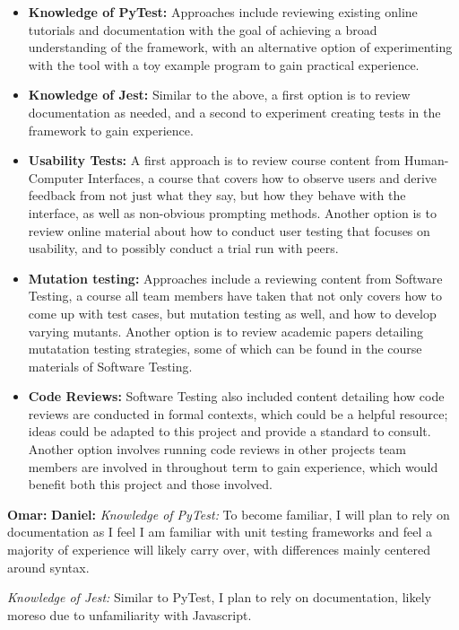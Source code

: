 \documentclass[12pt, titlepage]{article}
\begin{document}
\begin{enumerate}
  \begin{itemize}
    \item \textbf{Knowledge of PyTest:} Approaches include reviewing existing online tutorials and documentation with the goal of achieving a
    broad understanding of the framework, with an alternative option of experimenting with the tool with a toy example program to gain practical experience.
    \item \textbf{Knowledge of Jest:} Similar to the above, a first option is to review documentation as needed, and a second to experiment creating tests
    in the framework to gain experience.
    \item \textbf{Usability Tests:} A first approach is to review course content from Human-Computer Interfaces, a course that covers how to 
    observe users and derive feedback from not just what they say, but how they behave with the interface, as well as non-obvious prompting methods.
    Another option is to review online material about how to conduct user testing that focuses on usability, and to possibly conduct a trial run 
    with peers.
    \item \textbf{Mutation testing:} Approaches include a reviewing content from Software Testing, a course all team members have taken that not only 
    covers how to come up with test cases, but mutation testing as well, and how to develop varying mutants. Another option is to review 
    academic papers detailing mutatation testing strategies, some of which can be found in the course materials of Software Testing.
    \item \textbf{Code Reviews:} Software Testing also included content detailing how code reviews are conducted in formal contexts, which could be 
    a helpful resource; ideas could be adapted to this project and provide a standard to consult. Another option involves running code reviews in other 
    projects team members are involved in throughout term to gain experience, which would benefit both this project and those involved.
  \end{itemize}

  \textbf{Omar: }
  \newline
  \textbf{Daniel: }
  \textit{Knowledge of PyTest:} To become familiar, I will plan to rely on documentation as I feel I am familiar with unit testing frameworks and feel a majority of experience will likely carry over, with differences mainly centered around syntax.

  \textit{Knowledge of Jest:} Similar to PyTest, I plan to rely on documentation, likely moreso due to unfamiliarity with Javascript.


\end{enumerate}
\end{document}
